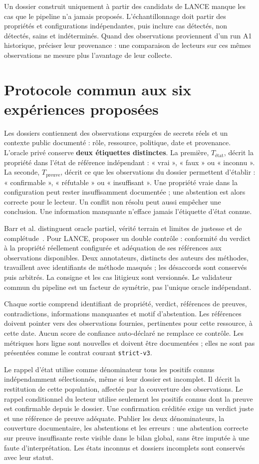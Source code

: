 \documentclass[11pt,a4paper]{article}
\begin{document}
Un dossier construit uniquement à partir des candidats de LANCE manque les
cas que le pipeline n'a jamais proposés. L'échantillonnage doit partir des
propriétés et configurations indépendantes, puis inclure cas détectés,
non détectés, sains et indéterminés. Quand des observations proviennent d'un
run A1 historique, préciser leur provenance : une comparaison de lecteurs sur
ces mêmes observations ne mesure plus l'avantage de leur collecte.

\section{Protocole commun aux six expériences proposées}
Les dossiers contiennent des observations expurgées de secrets réels et un
contexte public documenté : rôle, ressource, politique, date et provenance.
L'oracle privé conserve \textbf{deux étiquettes distinctes}. La première,
$T_{\text{état}}$, décrit la propriété dans l'état de référence indépendant :
« vrai », « faux » ou « inconnu ». La seconde, $T_{\text{preuve}}$, décrit
ce que les observations du dossier permettent d'établir : « confirmable »,
« réfutable » ou « insuffisant ». Une propriété vraie dans la configuration
peut rester insuffisamment documentée ; une abstention est alors correcte
pour le lecteur. Un conflit non résolu peut aussi empêcher une conclusion.
Une information manquante n'efface jamais l'étiquette d'état connue.

Barr et al. distinguent oracle partiel, vérité terrain et limites de justesse
et de complétude~\cite{barr}. Pour LANCE, proposer un double contrôle :
conformité du verdict à la propriété réellement configurée et adéquation de
ses références aux observations disponibles. Deux annotateurs, distincts
des auteurs des méthodes, travaillent avec identifiants de méthode masqués ;
les désaccords sont conservés puis arbitrés. La consigne et les cas litigieux
sont versionnés. Le validateur commun du pipeline est un facteur de symétrie,
pas l'unique oracle indépendant.

Chaque sortie comprend identifiant de propriété, verdict, références de
preuves, contradictions, informations manquantes et motif d'abstention.
Les références doivent pointer vers des observations fournies, pertinentes
pour cette ressource, à cette date. Aucun score de confiance auto-déclaré
ne remplace ce contrôle. Les métriques hors ligne sont nouvelles et doivent
être documentées ; elles ne sont pas présentées comme le contrat courant
\texttt{strict-v3}.

Le rappel d'état utilise comme dénominateur tous les positifs connus
indépendamment sélectionnés, même si leur dossier est incomplet. Il décrit la
restitution de cette population, affectée par la couverture des observations.
Le rappel conditionnel du lecteur utilise seulement les positifs connus dont
la preuve est confirmable depuis le dossier. Une confirmation créditée exige
un verdict juste et une référence de preuve adéquate. Publier les deux
dénominateurs, la couverture documentaire,
les abstentions et les erreurs : une abstention correcte sur preuve insuffisante
reste visible dans le bilan global, sans être imputée à une faute d'interprétation.
Les états inconnus et dossiers incomplets sont conservés avec leur statut.
\end{document}
